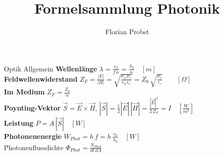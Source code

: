 \documentclass[8pt]{scrartcl}
\author{Florian Probst}
\title{Formelsammlung Photonik}
\begin{document}
	\begin{section}{Optik Allgemein}
		\textbf{Wellenlänge} $\lambda=\frac{c_0}{f\, n} = \frac{\lambda_0}{n}\quad[m]$\\[.2cm]
		\textbf{Feldwellenwiderstand} $Z_F=\frac{|E|}{|H|}=\sqrt{\frac{\mu_0 \, \mu_r}{\epsilon_0 \, \epsilon_r}}= Z_0 \, \sqrt{\frac{\mu_r}{\epsilon_r}} \qquad[\Omega]$\\[.2cm]
		\textbf{Im Medium} $Z_F = \frac{Z_0}{n}$\\[.2cm]
		\textbf{Poynting-Vektor} $\vec{S}=\vec{E}\times\vec{H}$, $|\vec{S}|=\frac{1}{2}|\vec{E}|\,|\vec{H}|=\frac{|\vec{E}|^2}{2\,Z_F}=I\quad [\frac{W}{m^2}]$\\[.2cm]
		\textbf{Leistung} $P= A\, |\vec{S}|\quad [W]$ \\[.2cm]
		\textbf{Photonenenergie} $W_{Phot}= h\,f=h\, \frac{c_0}{\lambda_0}\quad [W]$\\[.2cm]
		Photonenflussdichte $\Phi_{Phot}=\frac{N_{Phot}}{dt\,dA}$
		
	\end{section}
\end{document}
